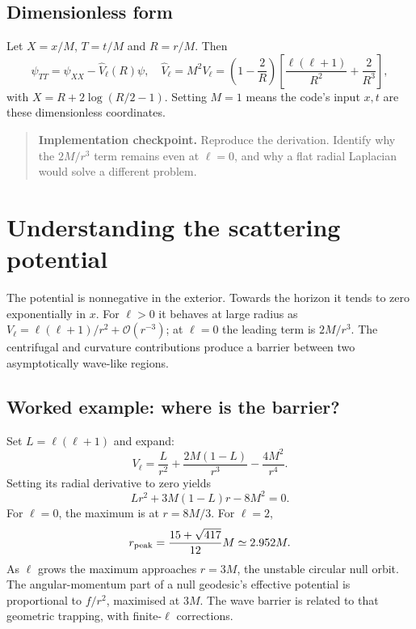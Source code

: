 \documentclass[11pt,a4paper]{article}
\numberwithin{equation}{section}
\newenvironment{checkpoint}{\begin{quote}\small\textbf{Implementation checkpoint.} }{\end{quote}}
\newcommand{\OO}{\mathcal{O}}
\begin{document}
\subsection{Dimensionless form}
Let $X=x/M$, $T=t/M$ and $R=r/M$. Then
\begin{equation}
 \psi_{TT}=\psi_{XX}-\widehat V_\ell(R)\psi,\quad
 \widehat V_\ell=M^2V_\ell=
 \left(1-\frac2R\right)\left[\frac{\ell(\ell+1)}{R^2}+\frac2{R^3}\right],
\end{equation}
with $X=R+2\log(R/2-1)$. Setting $M=1$ means the code's input $x,t$
are these dimensionless coordinates.

\begin{checkpoint}
Reproduce the derivation. Identify why the $2M/r^3$ term remains even at
$\ell=0$, and why a flat radial Laplacian would solve a different problem.
\end{checkpoint}

\section{Understanding the scattering potential}\label{sec:potential}

The potential is nonnegative in the exterior. Towards the horizon it tends
to zero exponentially in $x$. For $\ell>0$ it behaves at large radius as
$V_\ell=\ell(\ell+1)/r^2+\OO(r^{-3})$; at $\ell=0$ the leading term is
$2M/r^3$. The centrifugal and curvature contributions produce a barrier
between two asymptotically wave-like regions.

\subsection{Worked example: where is the barrier?}
Set $L=\ell(\ell+1)$ and expand:
\begin{equation}
 V_\ell=\frac L{r^2}+\frac{2M(1-L)}{r^3}-\frac{4M^2}{r^4}.
\end{equation}
Setting its radial derivative to zero yields
\begin{equation}
 Lr^2+3M(1-L)r-8M^2=0 .
\end{equation}
For $\ell=0$, the maximum is at $r=8M/3$. For $\ell=2$,
\begin{equation}
 r_{\rm peak}=\frac{15+\sqrt{417}}{12}M\simeq2.952M .
\end{equation}
As $\ell$ grows the maximum approaches $r=3M$, the unstable circular null
orbit. The angular-momentum part of a null geodesic's effective potential
is proportional to $f/r^2$, maximised at $3M$. The wave barrier is related
to that geometric trapping, with finite-$\ell$ corrections.
\end{document}
